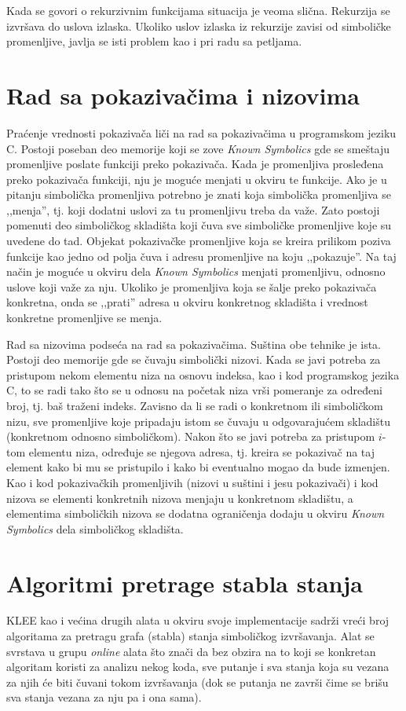 \documentclass[12pt,oneside]{memoir}
\begin{document}
Kada se govori o rekurzivnim funkcijama situacija je veoma slična. Rekurzija se izvršava do uslova izlaska. Ukoliko uslov izlaska iz rekurzije zavisi od simboličke promenljive, javlja se isti problem kao i pri radu sa petljama.

\section{Rad sa pokazivačima i nizovima}
Praćenje vrednosti pokazivača liči na rad sa pokazivačima u programskom jeziku C. Postoji poseban deo memorije koji se zove \textit{Known Symbolics} gde se smeštaju promenljive poslate funkciji preko pokazivača. Kada je promenljiva prosleđena preko pokazivača funkciji, nju je moguće menjati u okviru te funkcije. Ako je u pitanju simbolička promenljiva potrebno je znati koja simbolička promenljiva se ,,menja'', tj. koji dodatni uslovi za tu promenljivu treba da važe. Zato postoji pomenuti deo simboličkog skladišta koji čuva sve simboličke promenljive koje su uvedene do tad. Objekat pokazivačke promenljive koja se kreira prilikom poziva funkcije kao jedno od polja čuva i adresu promenljive na koju ,,pokazuje''. Na taj način je moguće u okviru dela \textit{Known Symbolics} menjati promenljivu, odnosno uslove koji važe za nju. Ukoliko je promenljiva koja se šalje preko pokazivača konkretna, onda se ,,prati'' adresa u okviru konkretnog skladišta i vrednost konkretne promenljive se menja.

Rad sa nizovima podseća na rad sa pokazivačima. Suština obe tehnike je ista. Postoji deo memorije gde se čuvaju simbolički nizovi. Kada se javi potreba za pristupom nekom elementu niza na osnovu indeksa, kao i kod programskog jezika C, to se radi tako što se u odnosu na početak niza vrši pomeranje za određeni broj, tj. baš traženi indeks. Zavisno da li se radi o konkretnom ili simboličkom nizu, sve promenljive koje pripadaju istom se čuvaju u odgovarajućem skladištu (konkretnom odnosno simboličkom). Nakon što se javi potreba za pristupom $i$-tom elementu niza, određuje se njegova adresa, tj. kreira se pokazivač na taj element kako bi mu se pristupilo i kako bi eventualno mogao da bude izmenjen. Kao i kod pokazivačkih promenljivih (nizovi u suštini i jesu pokazivači) i kod nizova se elementi konkretnih nizova menjaju u konkretnom skladištu, a elementima simboličkih nizova se dodatna ograničenja dodaju u okviru \textit{Known Symbolics} dela simboličkog skladišta.  

\section{Algoritmi pretrage stabla stanja} \label{algoritmi}
KLEE kao i većina drugih alata u okviru svoje implementacije sadrži vreći broj algoritama za pretragu grafa (stabla) stanja simboličkog izvršavanja. Alat se svrstava u grupu \textit{online} alata što znači da bez obzira na to koji se konkretan algoritam koristi za analizu nekog koda, sve putanje i sva stanja koja su vezana za njih će biti čuvani tokom izvršavanja (dok se putanja ne završi čime se brišu sva stanja vezana za nju pa i ona sama).
\end{document}
